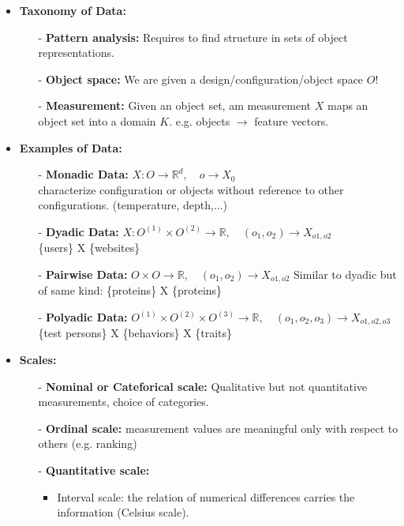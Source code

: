 \begin{itemize}
    \item\textbf{Taxonomy of Data: }
    \begin{itemize}
        \item[-]\textbf{Pattern analysis: }Requires to find structure in sets of object representations.
        \item[-]\textbf{Object space: }We are given a design/configuration/object space $O$!
        \item[-]\textbf{Measurement: }Given an object set, am measurement $X$ maps an object set into a domain $K$.
        e.g. objects $\rightarrow$ feature vectors.
    \end{itemize}{}
    \item\textbf{Examples of Data: }
    \begin{itemize}
        \item[-]\textbf{Monadic Data: }$X:O \rightarrow \mathbb{R}^d, \quad o \rightarrow X_{0}$\\
        characterize configuration or objects without reference to other configurations. (temperature, depth,...)
        \item[-]\textbf{Dyadic Data: }$X:O^{(1)} \times O^{(2)} \rightarrow \mathbb{R}, \quad (o_1,o_2) \rightarrow X_{o1,o2}$\\
        \{users\} X \{websites\}
        \item[-]\textbf{Pairwise Data: }$O \times O \rightarrow \mathbb{R}, \quad (o_1,o_2) \rightarrow X_{o1,o2}$
        Similar to dyadic but of same kind: \{proteins\} X \{proteins\}
        \item[-]\textbf{Polyadic Data: }$O^{(1)} \times O^{(2)} \times O^{(3)} \rightarrow \mathbb{R}, \quad (o_1,o_2,o_3) \rightarrow X_{o1,o2,o3}$\\
        \{test persons\} X \{behaviors\} X \{traits\}
    \end{itemize}{}
    \item\textbf{Scales: }
    \begin{itemize}
        \item[-]\textbf{Nominal or Cateforical scale: }Qualitative but not quantitative measurements, choice of categories.
        \item[-]\textbf{Ordinal scale: }measurement values are meaningful only with respect to others (e.g. ranking)
        \item[-]\textbf{Quantitative scale: }
        \begin{itemize}
            \item Interval scale: the relation of numerical differences carries the information (Celsius scale).

\end{itemize}
\end{itemize}
\end{itemize}
